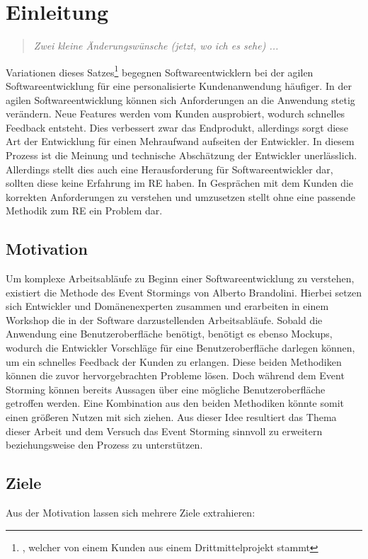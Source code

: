 \chapter{Einleitung}\label{ch:einleitung}

\begin{quote}
    \textit{Zwei kleine Änderungswünsche (jetzt, wo ich es sehe) ...}
\end{quote}


Variationen dieses Satzes\footnote{, welcher von einem Kunden aus einem Drittmittelprojekt stammt}
begegnen Softwareentwicklern bei der agilen Softwareentwicklung für eine personalisierte Kundenanwendung häufiger.
In der agilen Softwareentwicklung können sich Anforderungen an die Anwendung stetig verändern.
Neue Features werden vom Kunden ausprobiert, wodurch schnelles Feedback entsteht.
Dies verbessert zwar das Endprodukt, allerdings sorgt diese Art der Entwicklung für einen Mehraufwand aufseiten der Entwickler.
In diesem Prozess ist die Meinung und technische Abschätzung der Entwickler unerlässlich.
Allerdings stellt dies auch eine Herausforderung für Softwareentwickler dar, sollten diese keine Erfahrung im
\ac{RE} haben.
In Gesprächen mit dem Kunden die korrekten Anforderungen zu verstehen und umzusetzen stellt ohne eine passende Methodik zum
\ac{RE} ein Problem dar.

\section{Motivation}\label{sec:motivation}
Um komplexe Arbeitsabläufe zu Beginn einer Softwareentwicklung zu verstehen, existiert die Methode des Event Stormings von Alberto Brandolini.
Hierbei setzen sich Entwickler und Domänenexperten zusammen und erarbeiten in einem Workshop die in der Software darzustellenden Arbeitsabläufe.
Sobald die Anwendung eine Benutzeroberfläche benötigt, benötigt es ebenso Mockups, wodurch die Entwickler Vorschläge für eine Benutzeroberfläche
darlegen können, um ein schnelles Feedback der Kunden zu erlangen.
Diese beiden Methodiken können die zuvor hervorgebrachten Probleme lösen.
Doch während dem Event Storming können bereits Aussagen über eine mögliche Benutzeroberfläche getroffen werden.
Eine Kombination aus den beiden Methodiken könnte somit einen größeren Nutzen mit sich ziehen.
Aus dieser Idee resultiert das Thema dieser Arbeit und dem Versuch das Event Storming sinnvoll zu erweitern beziehungsweise den Prozess zu unterstützen.

\section{Ziele}\label{sec:ziele}
Aus der Motivation lassen sich mehrere Ziele extrahieren:


